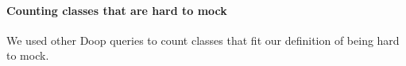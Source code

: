 \paragraph{Counting classes that are hard to mock}

We used other Doop queries to count classes that fit our definition of being hard to mock.









